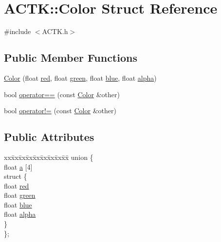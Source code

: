 \hypertarget{struct_a_c_t_k_1_1_color}{\section{A\-C\-T\-K\-:\-:Color Struct Reference}
\label{struct_a_c_t_k_1_1_color}
}


{\ttfamily \#include $<$A\-C\-T\-K.\-h$>$}

\subsection*{Public Member Functions}
\begin{DoxyCompactItemize}
\item 
\hyperlink{struct_a_c_t_k_1_1_color_a97d431e906c9f550a14dbae813fe4668}{Color} (float \hyperlink{struct_a_c_t_k_1_1_color_aa1800ef627fccd35c2c4e33042fc5781}{red}, float \hyperlink{struct_a_c_t_k_1_1_color_a83d16d56659a205b37a1320b506cfb9c}{green}, float \hyperlink{struct_a_c_t_k_1_1_color_a3e84d1d17f5134ba37967e4468ff50f9}{blue}, float \hyperlink{struct_a_c_t_k_1_1_color_a157ab4e7701f73b08600ddb957d9f3bd}{alpha})
\item 
bool \hyperlink{struct_a_c_t_k_1_1_color_aaac7011cd91c620dc46db571ebcf5ab9}{operator==} (const \hyperlink{struct_a_c_t_k_1_1_color}{Color} \&other)
\item 
bool \hyperlink{struct_a_c_t_k_1_1_color_a7c06f24e8d2e0f88a5c4c63e2639d6f0}{operator!=} (const \hyperlink{struct_a_c_t_k_1_1_color}{Color} \&other)
\end{DoxyCompactItemize}
\subsection*{Public Attributes}
\begin{DoxyCompactItemize}
\item 
\begin{tabbing}
xx\=xx\=xx\=xx\=xx\=xx\=xx\=xx\=xx\=\kill
union \{\\
\>float \hyperlink{struct_a_c_t_k_1_1_color_ada907cf30e7221f71ca52899b4818f77}{a} \mbox{[}4\mbox{]}\\
\>struct \{\\
\>\>float \hyperlink{struct_a_c_t_k_1_1_color_aa1800ef627fccd35c2c4e33042fc5781}{red}\\
\>\>float \hyperlink{struct_a_c_t_k_1_1_color_a83d16d56659a205b37a1320b506cfb9c}{green}\\
\>\>float \hyperlink{struct_a_c_t_k_1_1_color_a3e84d1d17f5134ba37967e4468ff50f9}{blue}\\
\>\>float \hyperlink{struct_a_c_t_k_1_1_color_a157ab4e7701f73b08600ddb957d9f3bd}{alpha}\\
\>\} \\
\}; \\

\end{tabbing}\end{DoxyCompactItemize}


